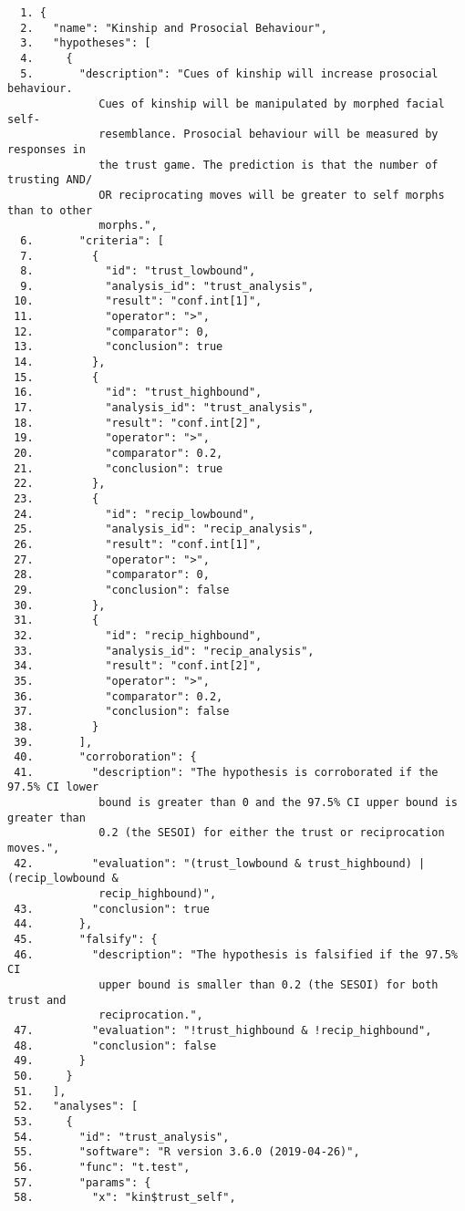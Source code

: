 \documentclass[english,doc,floatsintext]{apa6}
\begin{document}
\begin{verbatim}
  1. {
  2.   "name": "Kinship and Prosocial Behaviour",
  3.   "hypotheses": [
  4.     {
  5.       "description": "Cues of kinship will increase prosocial behaviour.
              Cues of kinship will be manipulated by morphed facial self-
              resemblance. Prosocial behaviour will be measured by responses in
              the trust game. The prediction is that the number of trusting AND/
              OR reciprocating moves will be greater to self morphs than to other
              morphs.",
  6.       "criteria": [
  7.         {
  8.           "id": "trust_lowbound",
  9.           "analysis_id": "trust_analysis",
 10.           "result": "conf.int[1]",
 11.           "operator": ">",
 12.           "comparator": 0,
 13.           "conclusion": true
 14.         },
 15.         {
 16.           "id": "trust_highbound",
 17.           "analysis_id": "trust_analysis",
 18.           "result": "conf.int[2]",
 19.           "operator": ">",
 20.           "comparator": 0.2,
 21.           "conclusion": true
 22.         },
 23.         {
 24.           "id": "recip_lowbound",
 25.           "analysis_id": "recip_analysis",
 26.           "result": "conf.int[1]",
 27.           "operator": ">",
 28.           "comparator": 0,
 29.           "conclusion": false
 30.         },
 31.         {
 32.           "id": "recip_highbound",
 33.           "analysis_id": "recip_analysis",
 34.           "result": "conf.int[2]",
 35.           "operator": ">",
 36.           "comparator": 0.2,
 37.           "conclusion": false
 38.         }
 39.       ],
 40.       "corroboration": {
 41.         "description": "The hypothesis is corroborated if the 97.5% CI lower
              bound is greater than 0 and the 97.5% CI upper bound is greater than
              0.2 (the SESOI) for either the trust or reciprocation moves.",
 42.         "evaluation": "(trust_lowbound & trust_highbound) | (recip_lowbound &
              recip_highbound)",
 43.         "conclusion": true
 44.       },
 45.       "falsify": {
 46.         "description": "The hypothesis is falsified if the 97.5% CI
              upper bound is smaller than 0.2 (the SESOI) for both trust and
              reciprocation.",
 47.         "evaluation": "!trust_highbound & !recip_highbound",
 48.         "conclusion": false
 49.       }
 50.     }
 51.   ],
 52.   "analyses": [
 53.     {
 54.       "id": "trust_analysis",
 55.       "software": "R version 3.6.0 (2019-04-26)",
 56.       "func": "t.test",
 57.       "params": {
 58.         "x": "kin$trust_self",

\end{verbatim}
\end{document}
